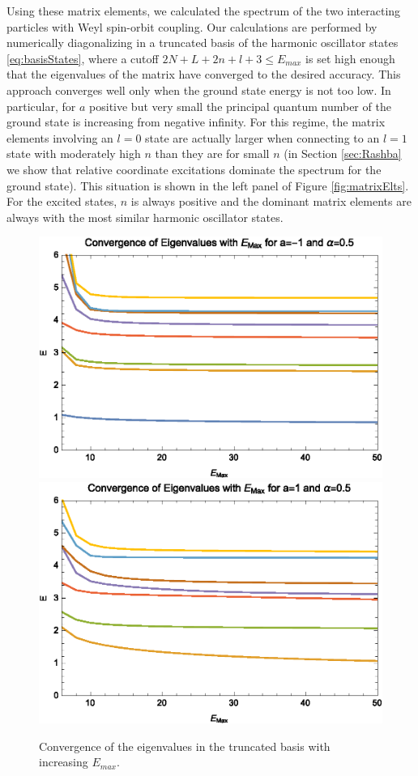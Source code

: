 \documentclass[%
 preprint,
 amsmath,amssymb,
 aps,
]{revtex4-1}
\begin{document}
Using these matrix elements, we calculated the spectrum of the two interacting particles with Weyl spin-orbit coupling. Our calculations are performed by numerically diagonalizing in a truncated basis of the harmonic oscillator states \eqref{eq:basisStates}, where a cutoff $2N+L+2n+l+3\leq E_{max}$ is set high enough that the eigenvalues of the matrix have converged to the desired accuracy.  This approach converges well only when the ground state energy is not too low. In particular, for $a$ positive but very small the principal quantum number of the ground state is increasing from negative infinity. For this regime, the matrix elements involving an $l=0$ state are actually larger when connecting to an $l=1$ state with moderately high $n$ than they are for small $n$ (in Section \ref{sec:Rashba} we show that relative coordinate excitations dominate the spectrum for the ground state). This situation is shown in the left panel of Figure \ref{fig:matrixElts}. For the excited states, $n$ is always positive and the dominant matrix elements are always with the most similar harmonic oscillator states.

\begin{figure}
\includegraphics[width=0.5\linewidth]{Figures/WeylConvM1}\nobreak
\includegraphics[width=0.5\linewidth]{Figures/WeylConvP1}
\caption{\label{fig:WeylConvergence} Convergence of the eigenvalues in the truncated basis with increasing $E_{max}$.} 
\end{figure}
\end{document}
